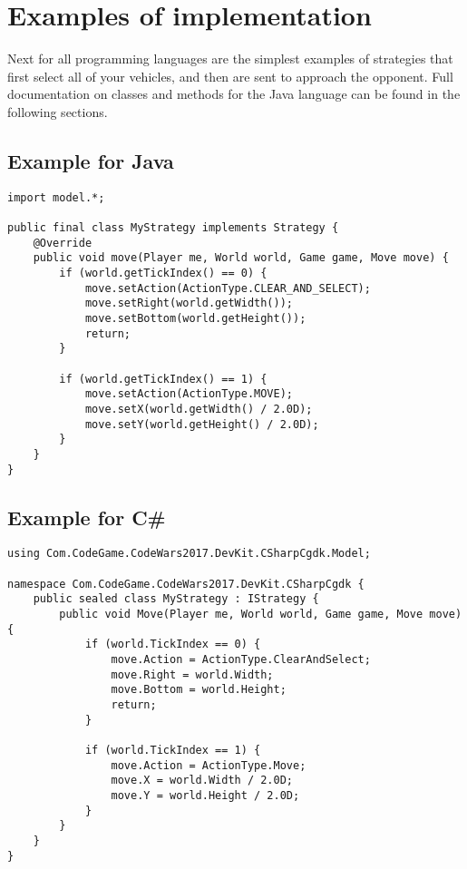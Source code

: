 \newpage
\section{Examples of implementation}

Next for all programming languages are the simplest examples of strategies that first select all of your vehicles, and then are sent
to approach the opponent. Full documentation on classes and methods for the Java language can be found in the following sections.

\subsection{Example for Java}

\begin{verbatim}
import model.*;

public final class MyStrategy implements Strategy {
    @Override
    public void move(Player me, World world, Game game, Move move) {
        if (world.getTickIndex() == 0) {
            move.setAction(ActionType.CLEAR_AND_SELECT);
            move.setRight(world.getWidth());
            move.setBottom(world.getHeight());
            return;
        }

        if (world.getTickIndex() == 1) {
            move.setAction(ActionType.MOVE);
            move.setX(world.getWidth() / 2.0D);
            move.setY(world.getHeight() / 2.0D);
        }
    }
}
\end{verbatim}

\subsection{Example for C\#}

\begin{verbatim}
using Com.CodeGame.CodeWars2017.DevKit.CSharpCgdk.Model;

namespace Com.CodeGame.CodeWars2017.DevKit.CSharpCgdk {
    public sealed class MyStrategy : IStrategy {
        public void Move(Player me, World world, Game game, Move move) {
            if (world.TickIndex == 0) {
                move.Action = ActionType.ClearAndSelect;
                move.Right = world.Width;
                move.Bottom = world.Height;
                return;
            }

            if (world.TickIndex == 1) {
                move.Action = ActionType.Move;
                move.X = world.Width / 2.0D;
                move.Y = world.Height / 2.0D;
            }
        }
    }
}
\end{verbatim}

